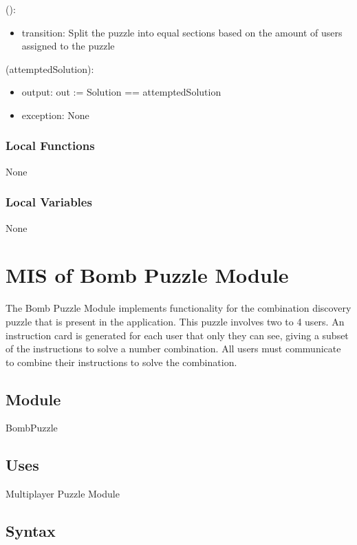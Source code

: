 \documentclass[12pt, titlepage]{article}
\begin{document}
():
\begin{itemize}
\item transition: Split the puzzle into equal sections based on the amount of users assigned to the puzzle 
\end{itemize}

(attemptedSolution):
\begin{itemize}
\item output: out := Solution == attemptedSolution
\item exception: None
\end{itemize}

\subsubsection{Local Functions}

None

\subsubsection{Local Variables}

None

\newpage

\section{MIS of Bomb Puzzle Module} \label{Combination} 

\noindent The Bomb Puzzle Module implements functionality for the combination discovery puzzle that is present in the application. This puzzle involves two to 4 users. An instruction card is generated for each user that only they can see, giving a subset of the instructions to solve a number combination. All users must communicate to combine their instructions to solve the combination.

\subsection{Module}
BombPuzzle

\subsection{Uses}
Multiplayer Puzzle Module

\subsection{Syntax}
\end{document}
